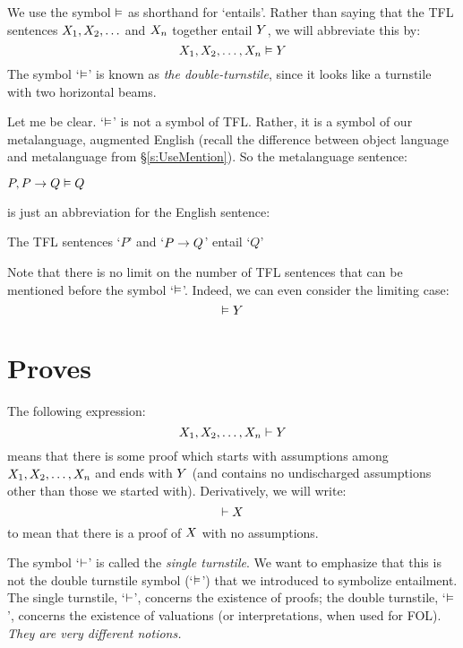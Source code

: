 \label{doubleTurnstile}
We use the symbol $\vDash$ as shorthand for `entails'. 
Rather than saying that the TFL sentences $X_1, X_2, \ldots$ and $X_n$ together entail $Y$, we will abbreviate this by:
$$X_1, X_2, \ldots, X_n \vDash Y$$
The symbol `$\vDash$' is known as \emph{the double-turnstile}, since it looks like a turnstile with two horizontal beams.

Let me be clear. `$\vDash$' is not a symbol of TFL. Rather, it is a symbol of our metalanguage, augmented English (recall the difference between object language and metalanguage from \S\ref{s:UseMention}). So the metalanguage sentence:
\begin{ebullet}
	\item $P, P \rightarrow Q \vDash Q$
\end{ebullet}
is just an abbreviation for the English sentence:
\begin{ebullet}
	\item The TFL sentences `$P$' and `$P \rightarrow Q$' entail `$Q$'
\end{ebullet}
Note that there is no limit on the number of TFL sentences that can be mentioned before the symbol `$\vDash$'. Indeed, we can even consider the limiting case:
$$\vDash Y$$

\section{Proves}
The following expression:
$$X_1, X_2, \ldots, X_n \vdash Y$$
means that there is some proof which starts with assumptions among $X_1, X_2, \ldots, X_n$ and ends with $Y$ (and contains no undischarged assumptions other than those we started with). Derivatively, we will write:
$$\vdash X$$
to mean that there is a proof of $X$ with no assumptions. 

The symbol `$\vdash$' is called the \emph{single turnstile}. We want to emphasize that this is not the {double turnstile} symbol (`$\vDash$') that we introduced  to symbolize entailment. The single turnstile, `$\vdash$', concerns the existence of proofs; the double turnstile, `$\vDash$', concerns the existence of valuations (or interpretations, when used for FOL). \emph{They are very different notions.}




